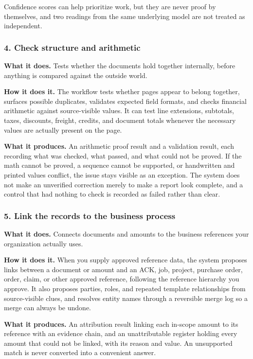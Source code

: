 \documentclass[
]{article}
\begin{document}
Confidence scores can help prioritize work, but they are never proof by
themselves, and two readings from the same underlying model are not
treated as independent.

\subsubsection{4. Check structure and
arithmetic}\label{check-structure-and-arithmetic}

\textbf{What it does.} Tests whether the documents hold together
internally, before anything is compared against the outside world.

\textbf{How it does it.} The workflow tests whether pages appear to
belong together, surfaces possible duplicates, validates expected field
formats, and checks financial arithmetic against source-visible values.
It can test line extensions, subtotals, taxes, discounts, freight,
credits, and document totals whenever the necessary values are actually
present on the page.

\textbf{What it produces.} An arithmetic proof result and a validation
result, each recording what was checked, what passed, and what could not
be proved. If the math cannot be proved, a sequence cannot be supported,
or handwritten and printed values conflict, the issue stays visible as
an exception. The system does not make an unverified correction merely
to make a report look complete, and a control that had nothing to check
is recorded as failed rather than clear.

\subsubsection{5. Link the records to the business
process}\label{link-the-records-to-the-business-process}

\textbf{What it does.} Connects documents and amounts to the business
references your organization actually uses.

\textbf{How it does it.} When you supply approved reference data, the
system proposes links between a document or amount and an ACK, job,
project, purchase order, order, claim, or other approved reference,
following the reference hierarchy you approve. It also proposes parties,
roles, and repeated template relationships from source-visible clues,
and resolves entity names through a reversible merge log so a merge can
always be undone.

\textbf{What it produces.} An attribution result linking each in-scope
amount to its reference with an evidence chain, and an unattributable
register holding every amount that could not be linked, with its reason
and value. An unsupported match is never converted into a convenient
answer.
\end{document}
